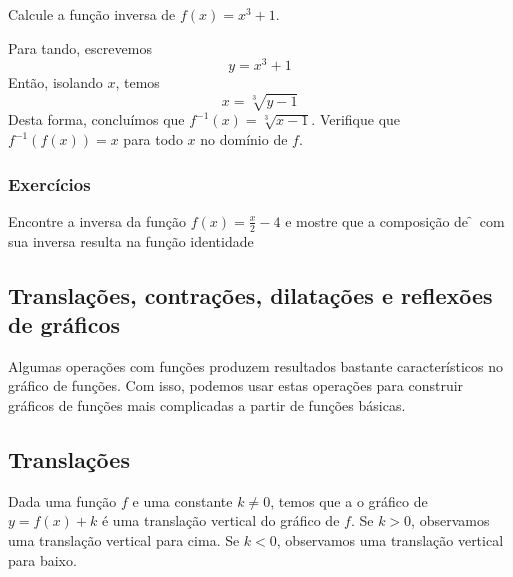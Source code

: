 \documentclass[../main.tex]{subfiles}
\begin{document}
\begin{ex}
Calcule  a função inversa de $f(x) = x^3 + 1$.\\ 
\begin{solution}
Para tando, escrevemos
  \begin{equation*}
    y = x^3 + 1
  \end{equation*}
  Então, isolando $x$, temos
  \begin{equation*}
    x = \sqrt[3]{y - 1}
  \end{equation*}
  Desta forma, concluímos que $f^{-1}(x) = \sqrt[3]{x-1}$. Verifique que $f^{-1}(f(x)) = x$ para todo $x$ no domínio de $f$.
\end{solution}
\end{ex}
\subsubsection{Exercícios}
\begin{exer}
  Encontre a inversa da função $f(x)=\frac{x}{2}-4$ e mostre que a composição de \f~\!com sua inversa resulta na função identidade
\end{exer}
\subsection{Translações, contrações, dilatações e reflexões de gráficos}\label{subsec:Trans-dilat-cont-reflexao}
Algumas operações com funções produzem resultados bastante característicos no gráfico de funções. Com isso, podemos usar estas operações para construir gráficos de funções mais complicadas a partir de funções básicas.
\subsection{Translações}
Dada uma função $f$ e uma constante $k\neq 0$, temos que a o gráfico de $y = f(x) + k$ é uma translação vertical do gráfico de $f$. Se $k>0$, observamos uma translação vertical para cima. Se $k<0$, observamos uma translação vertical para baixo.\\
\end{document}

